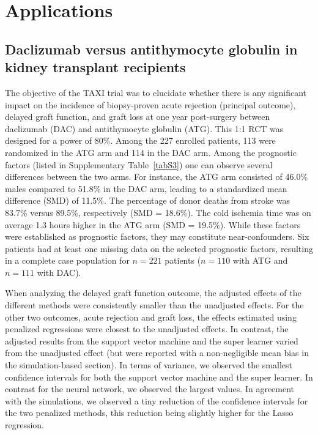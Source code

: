 \documentclass{article}
\begin{document}
\section{Applications}


\subsection{Daclizumab versus antithymocyte globulin in kidney transplant recipients}

The objective of the TAXI trial was to elucidate whether there is any significant impact on the incidence of biopsy-proven acute rejection (principal outcome), delayed graft function, and graft loss at one year post-surgery between daclizumab (DAC) and antithymocyte globulin (ATG).  \cite{noel_daclizumab_2009}  This  1:1 RCT was  designed for a power of 80\%. Among the 227 enrolled patients, 113 were randomized in the ATG arm and 114 in the DAC arm.
Among the  prognostic factors (listed in Supplementary Table~\ref{tabS3}) one can observe several  differences between the two arms. For instance, the ATG arm consisted of 46.0\% males compared to 51.8\% in the DAC arm, leading to a standardized mean difference (SMD) of 11.5\%. The percentage of donor deaths from stroke was 83.7\% versus 89.5\%, respectively (SMD = 18.6\%). The cold ischemia time was on average 1.3 hours higher in the ATG arm (SMD = 19.5\%). While these factors were established as prognostic factors, they may constitute near-confounders. Six patients had at least one missing data on the selected prognostic factors, resulting in a complete case population for $n=221$ patients ($n=110$ with ATG and $n=111$ with DAC).

When analyzing the delayed graft function outcome, the adjusted effects of the different methods were consistently smaller than the unadjusted effects. For the other two outcomes, acute rejection and graft loss, the effects estimated using penalized regressions were closest to the unadjusted effects. In contrast, the adjusted results from the support vector machine and the super learner varied from the unadjusted effect (but were reported with a non-negligible mean bias in the simulation-based section). In terms of variance, we observed the smallest confidence intervals for both the support vector machine and the super learner. In contrast for the neural network, we observed the largest values. In agreement with the simulations, we observed a tiny reduction of the confidence intervals for the two penalized methods, this reduction being slightly higher for the Lasso regression.
\end{document}

